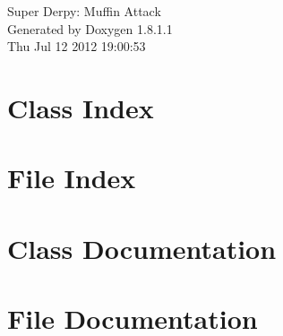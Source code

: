 \documentclass{book}
\begin{document}
\hypersetup{pageanchor=false,citecolor=blue}
\begin{titlepage}
\vspace*{7cm}
\begin{center}
{\Large Super Derpy\-: Muffin Attack }\\
\vspace*{1cm}
{\large Generated by Doxygen 1.8.1.1}\\
\vspace*{0.5cm}
{\small Thu Jul 12 2012 19:00:53}\\
\end{center}
\end{titlepage}
\clearemptydoublepage
{}
\tableofcontents
\clearemptydoublepage
{}
\hypersetup{pageanchor=true,citecolor=blue}
\chapter{Class Index}

\chapter{File Index}

\chapter{Class Documentation}













\chapter{File Documentation}






























\printindex
\end{document}
